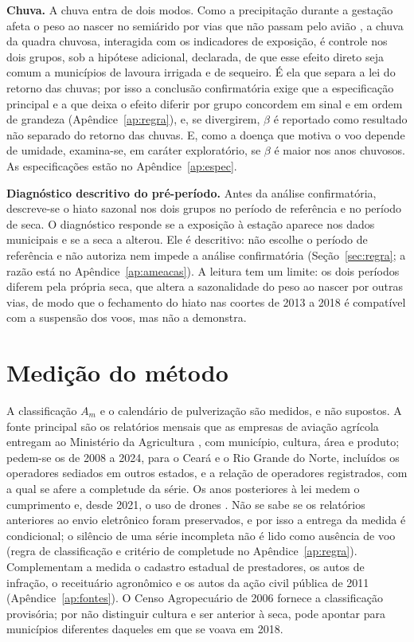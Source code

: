 \textbf{Chuva.} A chuva entra de dois modos. Como a precipitação durante a
gestação afeta o peso ao nascer no semiárido por vias que não passam pelo
avião \cite{rocha2015water}, a chuva da quadra chuvosa, interagida com os indicadores de exposição, é controle nos dois grupos, sob a hipótese adicional, declarada, de que esse efeito
direto seja comum a municípios de lavoura irrigada e de sequeiro. É ela que
separa a lei do retorno das chuvas; por isso a conclusão confirmatória exige
que a especificação principal e a que deixa o efeito diferir por grupo
concordem em sinal e em ordem de grandeza (Apêndice~\ref{ap:regra}), e, se
divergirem, $\beta$ é reportado como resultado não separado do retorno das
chuvas. E, como a doença que motiva o
voo depende de umidade, examina-se, em caráter exploratório, se $\beta$ é maior
nos anos chuvosos. As especificações estão no Apêndice~\ref{ap:espec}.

\textbf{Diagnóstico descritivo do pré-período.}\label{sec:diagnostico} Antes
da análise confirmatória, descreve-se o hiato sazonal nos dois grupos no
período de referência e no período de seca. O diagnóstico responde se a
exposição à estação aparece nos dados municipais e se a seca a alterou. Ele é
descritivo: não escolhe o período de referência e não autoriza nem impede a
análise confirmatória (Seção~\ref{sec:regra}; a razão está no
Apêndice~\ref{ap:ameacas}). A leitura tem um limite: os dois períodos diferem
pela própria seca, que altera a sazonalidade do peso ao nascer por outras
vias, de modo que o fechamento do hiato nas coortes de 2013 a 2018 é
compatível com a suspensão dos voos, mas não a demonstra.

\section{Medição do método}
\label{sec:medicao}

A classificação $A_m$ e o calendário de pulverização são medidos, e não
supostos. A fonte principal são os relatórios mensais que as empresas de
aviação agrícola entregam ao Ministério da Agricultura \cite{mapa2008in2}, com
município, cultura, área e produto; pedem-se os de 2008 a 2024, para o Ceará e
o Rio Grande do Norte, incluídos os operadores sediados em outros estados, e a
relação de operadores registrados, com a qual se afere a completude da série.
Os anos posteriores à lei medem o cumprimento e, desde 2021, o uso de drones
\cite{mapa2021portaria298}. Não se sabe se os relatórios anteriores ao envio
eletrônico foram preservados, e por isso a entrega da medida é condicional; o
silêncio de uma série incompleta não é lido como ausência de voo (regra de
classificação e critério de completude no Apêndice~\ref{ap:regra}).
Complementam a medida o cadastro estadual de prestadores, os autos de
infração, o receituário agronômico e os autos da ação civil pública de 2011
(Apêndice~\ref{ap:fontes}). O Censo Agropecuário de 2006
\cite{ibge2006censoagro} fornece a classificação provisória; por não
distinguir cultura e ser anterior à seca, pode apontar para municípios
diferentes daqueles em que se voava em 2018.

